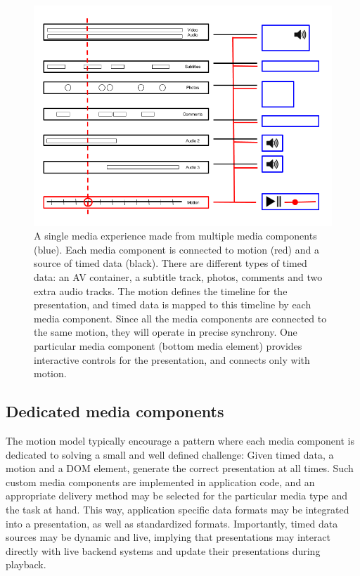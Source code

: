 \begin{figure}[h]
\centering
\includegraphics[scale=.4]{fig/motion-media.png}
\caption{A single media experience made from multiple media components (blue). Each media component is connected to motion (red) and a source of timed data (black). There are different types of timed data: an AV container, a subtitle track, photos, comments and two extra audio tracks. The motion defines the timeline for the presentation, and timed data is mapped to this timeline by each media component. Since all the media components are connected to the same motion, they will operate in precise synchrony. One particular media component (bottom media element) provides interactive controls for the presentation, and connects only with motion.}
\label{fig:motion-media}
\end{figure}


\subsection{Dedicated media components}

The motion model typically encourage a pattern where each media
component is dedicated to solving a small and well defined challenge: Given
timed data, a motion and a DOM element, generate the correct presentation at
all times. Such custom media components are implemented in application code,
and an appropriate delivery method may be selected for the particular media
type and the task at hand. This way, application specific data formats may be
integrated into a presentation, as well as standardized formats. Importantly,
timed data sources may be dynamic and live, implying that presentations may
interact directly with live backend systems and update their presentations
during playback.

